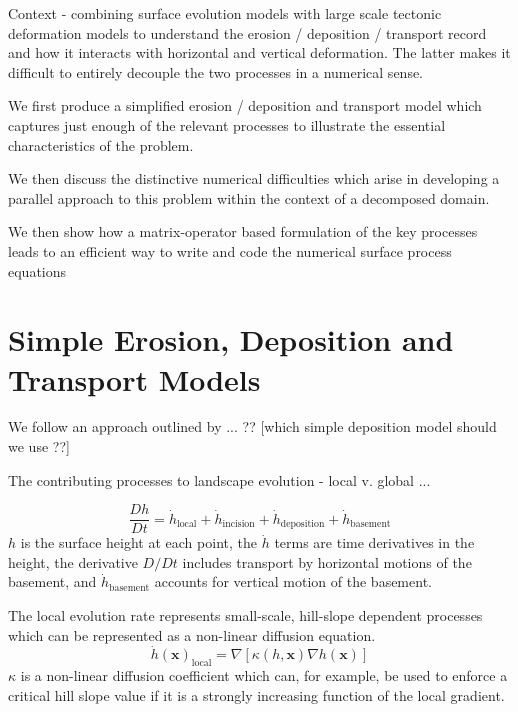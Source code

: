 \documentclass[draft,jgrga]{agu_template/AGUTeX}
\begin{document}
Context - combining surface evolution models with large scale tectonic deformation models to understand the erosion / deposition / transport record and how it interacts with horizontal and vertical deformation. The latter makes it difficult to entirely decouple the two processes in a numerical sense.


We first produce a simplified erosion / deposition and transport model which captures just enough of the relevant processes to illustrate the essential characteristics of the problem. 

We then discuss the distinctive numerical difficulties which arise in developing a parallel approach to this problem within the context of a decomposed domain. 

We then show how a matrix-operator based formulation of the key processes leads to an efficient way to write and code the numerical surface process equations 

\section{Simple Erosion, Deposition and Transport Models}

We follow an approach outlined by ... ?? [which simple deposition model should we use ??]

The contributing processes to landscape evolution - local v. global ... 

\begin{equation}
  \frac{Dh}{Dt} =  \dot{h}_\textrm{local} 
  				 + \dot{h}_\textrm{incision} 
  				 + \dot{h}_\textrm{deposition}   
  				 + \dot{h}_\textrm{basement}
\end{equation}
$h$ is the surface height at each point, the $\dot{h}$ terms are time derivatives in the height, the derivative $D/Dt$ includes transport by horizontal motions of the basement, and $\dot{h}_\textrm{basement}$ accounts for vertical motion of the basement.

The local evolution rate represents small-scale, hill-slope dependent processes which can be represented as a non-linear diffusion equation. 
\begin{equation}
	\dot{h}(\bm{x})_\textrm{local} = \nabla \left[\kappa(h,\bm{x}) \nabla h(\bm{x}) \right]
\end{equation}  
$\kappa$ is a non-linear diffusion coefficient which can, for example, be used to enforce a 
critical hill slope value if it is a strongly increasing function of the local gradient.
\end{document}
